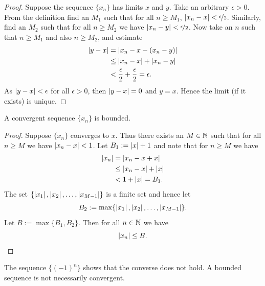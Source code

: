 \begin{proof}
Suppose the sequence $\{ x_n \}$ has limits $x$ and $y$.
Take an arbitrary $\epsilon > 0$.
From the definition find an $M_1$ such that for all $n \geq M_1$,
$\left\lvert {x_n-x} \right\rvert < \nicefrac{\epsilon}{2}$.  Similarly, find an $M_2$
such that for all $n \geq M_2$ we have
$\left\lvert {x_n-y} \right\rvert < \nicefrac{\epsilon}{2}$.
Now take an $n$ such that $n \geq M_1$ and also $n \geq M_2$, and estimate
\begin{equation*}
\begin{split}
\left\lvert {y-x} \right\rvert
& =
\left\lvert {x_n-x - (x_n -y)} \right\rvert \\
& \leq
\left\lvert {x_n-x} \right\rvert + \left\lvert {x_n -y} \right\rvert \\
& <
\frac{\epsilon}{2} + \frac{\epsilon}{2} = \epsilon .
\end{split}
\end{equation*}
As $\left\lvert {y-x} \right\rvert < \epsilon$ for all $\epsilon > 0$, then $\left\lvert {y-x} \right\rvert = 0$
and $y=x$.  Hence the limit (if it exists) is unique.
\end{proof}

\begin{prop}
A convergent sequence $\{ x_n \}$ is bounded.
\end{prop}

\begin{proof}
Suppose $\{ x_n \}$ converges to $x$.  Thus there exists an $M \in {\mathbb{N}}$
such that for all $n \geq M$ we have
$\left\lvert {x_n - x} \right\rvert < 1$.  Let $B_1 := \left\lvert {x} \right\rvert+1$ and note that for $n \geq M$ we
have
\begin{equation*}
\begin{split}
\left\lvert {x_n} \right\rvert & = \left\lvert {x_n - x + x} \right\rvert
\\
& \leq \left\lvert {x_n - x} \right\rvert + \left\lvert {x} \right\rvert
\\
& < 1 + \left\lvert {x} \right\rvert = B_1 .
\end{split}
\end{equation*}
The set $\{ \left\lvert {x_1} \right\rvert, \left\lvert {x_2} \right\rvert, \ldots, \left\lvert {x_{M-1}} \right\rvert \}$
is a finite set and hence let
\begin{equation*}
B_2 := \max \{ \left\lvert {x_1} \right\rvert, \left\lvert {x_2} \right\rvert, \ldots, \left\lvert {x_{M-1}} \right\rvert \} .
\end{equation*}
Let $B := \max \{ B_1, B_2 \}$.  Then for all $n \in {\mathbb{N}}$ we have
\begin{equation*}
\left\lvert {x_n} \right\rvert \leq B. \qedhere
\end{equation*}
\end{proof}

The sequence $\{ {(-1)}^n \}$ shows that the converse
does not hold.  A bounded sequence is not necessarily convergent.


